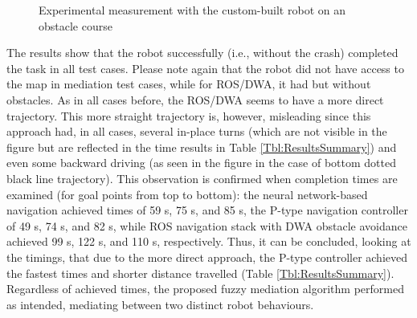 \begin{figure}
\centering
{}
\hfill
{}
\caption{Experimental measurement with the custom-built robot on an obstacle course}
\label{Fig:paletarTesting}
\end{figure}

The results show that the robot successfully (i.e., without the crash) completed the task in all test cases. Please note again that the robot did not have access to the map in mediation test cases, while for ROS/DWA, it had but without obstacles. As in all cases before, the ROS/DWA seems to have a more direct trajectory. This more straight trajectory is, however, misleading since this approach had, in all cases, several in-place turns (which are not visible in the figure but are reflected in the time results in Table \ref{Tbl:ResultsSummary}) and even some backward driving (as seen in the figure in the case of bottom dotted black line trajectory). This observation is confirmed when completion times are examined (for goal points from top to bottom): the neural network-based navigation achieved times of 59 s, 75 s, and 85 s, the P-type navigation controller of 49 s, 74 s, and 82 s, while ROS navigation stack with DWA obstacle avoidance achieved 99 s, 122 s, and 110 s, respectively. Thus, it can be concluded, looking at the timings, that due to the more direct approach, the P-type controller achieved the fastest times and shorter distance travelled (Table \ref{Tbl:ResultsSummary}). Regardless of achieved times, the proposed fuzzy mediation algorithm performed as intended, mediating between two distinct robot behaviours. 

